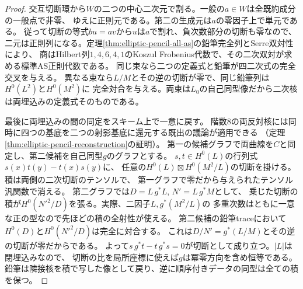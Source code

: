 \begin{proof}
交互切断環から$W$の二つの中心二次元で割る。一般の$a\in W$は全既約成分の一般点で非零、
ゆえに正則元である。第二の生成元は$a$の零因子上で単元である。
従って切断の等式$bu=av$から$u$は$a$で割れ、負次数部分の切断も零なので、
二元は正則列になる。定理\ref{thm:elliptic-pencil-all-as}の鉛筆完全列とSerre双対性により、
商はHilbert列$1,4,6,4,1$のKoszul Frobenius代数で、その二次双対が求める標準AS正則代数である。
同じ束なら二つの定義式と鉛筆が四二次式の完全交叉を与える。
異なる束なら$L/M$とその逆の切断が零で、同じ鉛筆列は$H^0(L^2)$と$H^0(M^2)$に
完全対合を与える。両束は$L_0$の自己同型像だから二次核は両埋込みの定義式そのものである。

最後に両埋込みの間の同定をスキーム上で一意に戻す。
階数8の両反対核には同時に四つの基底を二つの射影基底に還元する既出の議論が適用できる
（定理\ref{thm:elliptic-pencil-reconstruction}の証明）。
第一の候補グラフで両曲線を$C$と同定し、第二候補を自己同型$g$のグラフとする。
$s,t\in H^0(L)$の行列式$s(x)t(y)-t(x)s(y)$に、
任意の$H^0(L)\boxtimes H^0(M^2/L)$の切断を掛ける。積は両側の二次切断のテンソルで、
第一グラフで零だから与えられたテンソル汎関数で消える。
第二グラフでは$D=L\,g^*L$, $N'=L\,g^*M$として、
乗じた切断の積が$H^0(N'^2/D)$を張る。実際、二因子$L,g^*(M^2/L)$の
多重次数はともに一意な正の型なので先ほどの積の全射性が使える。
第二候補の鉛筆traceにおいて$H^0(D)$と$H^0(N'^2/D)$は完全に対合する。
これは$D/N'=g^*(L/M)$とその逆の切断が零だからである。
よって$s\,g^*t-t\,g^*s=0$が切断として成り立つ。$|L|$は閉埋込みなので、
切断の比を局所座標に使えば$g$は冪零方向を含め恒等である。
鉛筆は隣接核を積で写した像として戻り、逆に順序付きデータの同型は全ての積を保つ。
\end{proof}
